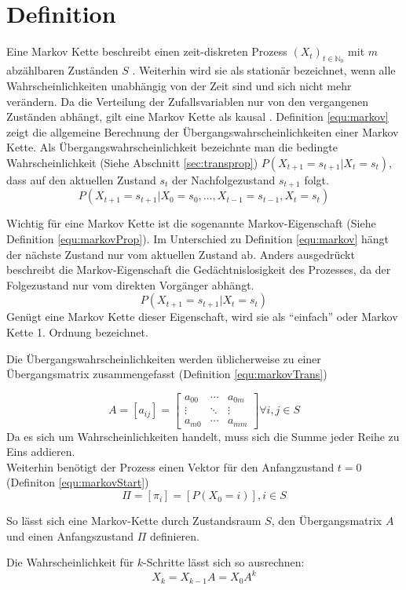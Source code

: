 \section{Definition} \label{sec:mkdef}
Eine Markov Kette beschreibt einen zeit-diskreten Prozess \((X_t)_{t\in\mathbb{N}_0}\) mit  \(m\) abzählbaren Zuständen \(S\) \cite{stochMod}.
Weiterhin wird sie als stationär bezeichnet, wenn alle Wahrscheinlichkeiten unabhängig von der Zeit sind und sich nicht mehr verändern.
Da die Verteilung der Zufallsvariablen nur von den vergangenen Zuständen abhängt, gilt eine Markov Kette als kausal \cite[48]{mmmFink}.
Definition \ref{equ:markov} zeigt die allgemeine Berechnung der Übergangswahrscheinlichkeiten einer Markov Kette. Als Übergangswahrscheinlichkeit bezeichnte man die bedingte Wahrscheinlichkeit (Siehe Abschnitt \ref{sec:transprop}) \(P ( X_{t+1} = s_{t+1} | X_{t} = s_{t} ) \), dass auf den aktuellen Zustand \( s_{t}\) der Nachfolgezustand \( s_{t+1}\) folgt. 
\begin{equation}
\label{equ:markov}
P (X_{t+1} = s_{t+1} | X_0 = s_0, \ldots , X_{t-1} = s_{t-1}, X_{t} = s_{t})
\end{equation}

Wichtig für eine Markov Kette ist die sogenannte Markov-Eigenschaft (Siehe Definition \ref{equ:markovProp}). Im Unterschied zu Definition \ref{equ:markov} hängt der nächste Zustand nur vom aktuellen Zustand ab. Anders ausgedrückt beschreibt die Markov-Eigenschaft die Gedächtnislosigkeit des Prozesses, da der Folgezustand nur vom direkten Vorgänger abhängt. 
\begin{equation}
\label{equ:markovProp}
P ( X_{t+1} = s_{t+1} | X_{t} = s_{t} ) 
\end{equation}
Genügt eine Markov Kette dieser Eigenschaft, wird sie als ``einfach'' oder Markov Kette 1. Ordnung bezeichnet.

Die Übergangswahrscheinlichkeiten werden üblicherweise zu einer Übergangsmatrix zusammengefasst (Definition \ref{equ:markovTrans}) 

\begin{equation}
\label{equ:markovTrans}
A = [a_{ij}] =
\begin {bmatrix} 
  a_{00}&\cdots&a_{0m} \\
  \vdots&\ddots&\vdots \\
  a_{m0}&\cdots&a_{mm}
 \end {bmatrix} \forall i, j \in S
\end{equation}
Da es sich um Wahrscheinlichkeiten handelt, muss sich die Summe jeder Reihe zu Eins addieren. \\

Weiterhin benötigt der Prozess einen Vektor für den Anfangzustand $t = 0$ (Definiton \ref{equ:markovStart})
\begin{equation}
 \label{equ:markovStart}
 \Pi = [ \pi_i] = [ P (X_0 = i) ] , i \in S
\end{equation}

So lässt sich eine Markov-Kette durch Zustandsraum \(S\), den Übergangsmatrix \( A \) und einen Anfangszustand \( \Pi \) definieren.

Die Wahrscheinlichkeit für \( k \)-Schritte lässt sich so ausrechnen: 
\[ X_k = X_{k-1} A = X_0 A^k \] 
